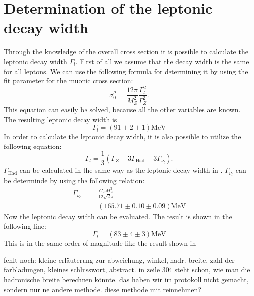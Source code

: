 \documentclass[epj,nopacs]{svjour}
\begin{document}
\section{Determination of the leptonic decay width}
Through the knowledge of the overall cross section it is possible to calculate
the leptonic decay width $Γ_l$. First of all we assume that the decay width is
the same for all leptons. We can use the following formula for determining it
by using the fit parameter for the muonic cross section:
\begin{equation}
σ_0^μ = \frac{12π}{M_Z^2}\frac{Γ_l^2}{Γ_Z^2}.
\label{eqn:leptonicwidth}
\end{equation}
This equation can easily be solved, because all the other variables are known.
The resulting leptonic decay width is
\begin{equation}
Γ_l = (91 \pm 2 \pm 1)\si{\mega\electronvolt}
\label{eqn:leptonicwidthresult}
\end{equation}
In order to calculate the leptonic decay width, it is also possible to utilize
the following equation:
\begin{equation}
Γ_l = \frac{1}{3}(Γ_Z - 3Γ_{\mathrm{Had}} - 3Γ_{ν_l}).
\end{equation}
$Γ_{\mathrm{Had}}$ can be calculated in the same way as the leptonic decay
width in . $Γ_{ν_l}$ can be determinde by using the
following relation:
\begin{eqnarray}
Γ_{ν_e} &=& \frac{G_FM_Z^3}{12\sqrt{2}π}\\
&=& (165.71 \pm 0.10 \pm 0.09)\si{\mega\electronvolt}
\end{eqnarray}
Now the leptonic decay width can be evaluated. The result is shown in the
following line:
\begin{equation}
Γ_l = (83 \pm 4 \pm 3) \si{\mega\electronvolt}
\end{equation}
This is in the same order of magnitude like the result shown in

fehlt noch: kleine erläuterung zur abweichung, winkel, hadr. breite, zahl der
farbladungen, kleines schlusswort, abstract.
in zeile 304 steht schon, wie man die hadronische breite berechnen könnte. das
haben wir im protokoll nicht gemacht, sondern nur ne andere methode. diese
methode mit reinnehmen? 
\end{document}
